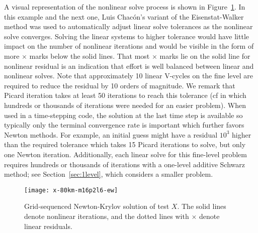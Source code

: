 A visual representation of the nonlinear solve process is shown in Figure~\ref{fig:xgridseq}.
In this example and the next one, Luis Chac\'on's variant of the Eisenstat-Walker~\citep{eisenstat1996cft} method was used to automatically adjust linear solve tolerances as the nonlinear solve converges.  Solving the linear systems to higher tolerance would have little impact on the number of nonlinear iterations and would be visible in the form of more $\times$ marks below the solid lines.  That most $\times$ marks lie on the solid line for nonlinear residual is an indication that effort is well balanced between linear and nonlinear solves.
Note that approximately 10 linear V-cycles on the fine level are required to reduce the residual by 10 orders of magnitude.
We remark that Picard iteration takes at least 50 iterations to reach this tolerance (cf\onedot \citet{desmedt2010using} in which hundreds or thousands of iterations were needed for an easier problem).
When used in a time-stepping code, the solution at the last time step is available so typically only the terminal convergence rate is important which further favors Newton methods.
For example, an initial guess might have a residual $10^3$ higher than the required tolerance which takes 15 Picard iterations to solve, but only one Newton iteration.
Additionally, each linear solve for this fine-level problem requires hundreds or thousands of iterations with a one-level additive Schwarz method; see Section~\ref{sec:1level}, which considers a smaller problem.

\begin{figure}
  \centering\texttt{[image: x-80km-m16p2l6-ew]}
  \caption{Grid-sequenced Newton-Krylov solution of test $X$.  The solid lines denote nonlinear iterations, and the dotted lines with $\times$ denote linear residuals.}\label{fig:xgridseq}
\end{figure}

